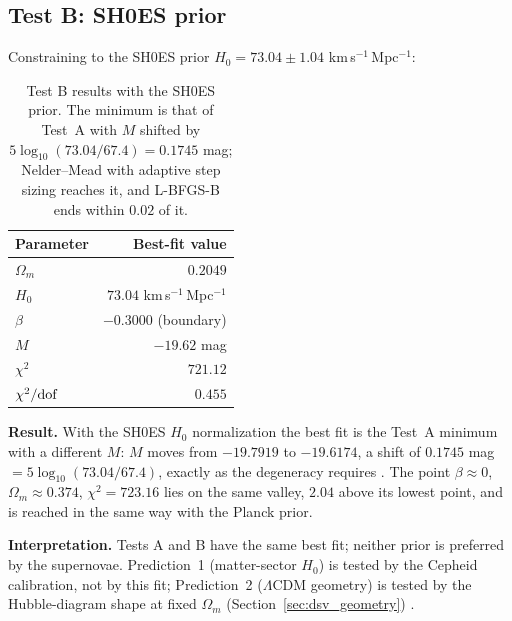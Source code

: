 \subsection{Test B: SH0ES prior}
Constraining to the SH0ES prior $H_0=73.04\pm1.04$ km\,s$^{-1}$\,Mpc$^{-1}$:
\begin{table}[htbp]\centering\small
\caption[Test B: SH0ES prior]{Test B results with the SH0ES prior. The minimum is that of Test~A with $M$ shifted by
$5\log_{10}(73.04/67.4)=0.1745$ mag; Nelder--Mead with adaptive step sizing reaches it, and L-BFGS-B ends within $0.02$ of it. \calc}\label{tab:dsv_testB}
\begin{tabular}{lr}\toprule
Parameter & Best-fit value\\\midrule
$\Omega_m$ & $0.2049$\\
$H_0$ & $73.04$ km\,s$^{-1}$\,Mpc$^{-1}$\\
$\beta$ & $-0.3000$ (boundary)\\
$M$ & $-19.62$ mag\\
$\chi^2$ & $721.12$\\
$\chi^2/{\rm dof}$ & $0.455$\\\bottomrule
\end{tabular}
\end{table}
\textbf{Result.} With the SH0ES $H_0$ normalization the best fit is the Test~A minimum with a different $M$: $M$ moves from $-19.7919$ to
$-19.6174$, a shift of $0.1745$ mag $=5\log_{10}(73.04/67.4)$, exactly as the degeneracy requires \calc. The point $\beta\approx0$, $\Omega_m\approx0.374$,
$\chi^2=723.16$ lies on the same valley, $2.04$ above its lowest point, and is reached in the same way with the Planck prior.

\textbf{Interpretation.} Tests A and B have the same best fit; neither prior is preferred by the supernovae. Prediction~1 (matter-sector $H_0$) is
tested by the Cepheid calibration, not by this fit; Prediction~2 ($\Lambda$CDM geometry) is tested by the Hubble-diagram shape at fixed $\Omega_m$
(Section~\ref{sec:dsv_geometry}) \derived.

